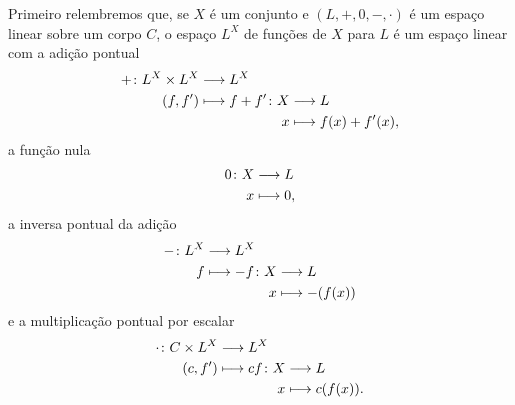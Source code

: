 Primeiro relembremos que, se $X$ é um conjunto e $(L,+,0,-,\cdot)$ é um espaço linear sobre um corpo $C$, o espaço $L^X$ de funções de $X$ para $L$ é um espaço linear com a adição pontual
	\begin{align*}
	\func{+}{L^X \times L^X}{L^X}{(f,f')}{
		\begin{aligned}[t]
		\func{f+f'}{X}{L}{x}{f(x)+f'(x),}
		\end{aligned}	
	}
	\end{align*}
a função nula
	\begin{align*}
	\func{0}{X}{L}{x}{0,}
	\end{align*}
a inversa pontual da adição
	\begin{align*}
	\func{-}{L^X}{L^X}{f}{
		\begin{aligned}[t]
		\func{-f}{X}{L}{x}{-(f(x))}
		\end{aligned}
	}
	\end{align*}
e a multiplicação pontual por escalar
	\begin{align*}
	\func{\cdot}{C \times L^X}{L^X}{(c,f')}{
		\begin{aligned}[t]
		\func{cf}{X}{L}{x}{c(f(x)).}
		\end{aligned}	
	}
	\end{align*}

